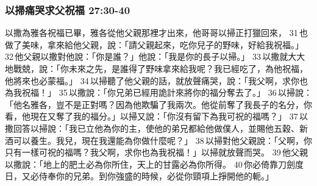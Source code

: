 \subsubsection{以掃痛哭求父祝福 27:30-40}
以撒為雅各祝福已畢，雅各從他父親那裡才出來，他哥哥以掃正打獵回來， 31 也做了美味，拿來給他父親，說：「請父親起來，吃你兒子的野味，好給我祝福。」 32 他父親以撒對他說：「你是誰？」他說：「我是你的長子以掃。」 33 以撒就大大地戰兢，說：「你未來之先，是誰得了野味拿來給我呢？我已經吃了，為他祝福，他將來也必蒙福。」 34 以掃聽了他父親的話，就放聲痛哭，說：「我父啊，求你也為我祝福！」 35 以撒說：「你兄弟已經用詭計來將你的福分奪去了。」 36 以掃說：「他名雅各，豈不是正對嗎？因為他欺騙了我兩次。他從前奪了我長子的名分，你看，他現在又奪了我的福分。」以掃又說：「你沒有留下為我可祝的福嗎？」 37 以撒回答以掃說：「我已立他為你的主，使他的弟兄都給他做僕人，並賜他五穀、新酒可以養生。我兒，現在我還能為你做什麼呢？」 38 以掃對他父親說：「父啊，你只有一樣可祝的福嗎？我父啊，求你也為我祝福！」以掃就放聲而哭。 39 他父親以撒說：「地上的肥土必為你所住，天上的甘露必為你所得。 40 你必倚靠刀劍度日，又必侍奉你的兄弟。到你強盛的時候，必從你頸項上掙開他的軛。」

